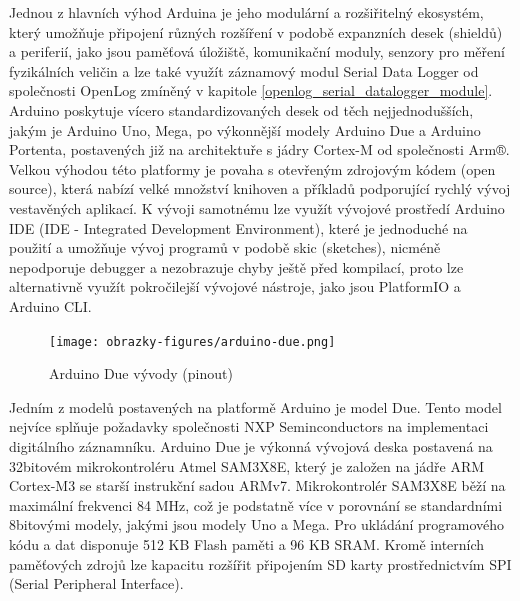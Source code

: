Jednou z hlavních výhod Arduina je jeho modulární a rozšiřitelný ekosystém, který umožňuje připojení různých rozšíření v podobě expanzních desek (shieldů) a periferií, jako jsou paměťová úložiště, komunikační moduly, senzory pro měření fyzikálních veličin a lze také využít záznamový modul Serial Data Logger od společnosti OpenLog zmíněný v kapitole \ref{openlog_serial_datalogger_module}. Arduino poskytuje vícero standardizovaných desek od těch nejjednodušších, jakým je Arduino Uno, Mega, po výkonnější modely Arduino Due a Arduino Portenta, postavených již na architektuře s jádry Cortex-M od společnosti Arm®. Velkou výhodou této platformy je povaha s otevřeným zdrojovým kódem (open source), která nabízí velké množství knihoven a příkladů podporující rychlý vývoj vestavěných aplikací. K vývoji samotnému lze využít vývojové prostředí Arduino IDE (IDE - Integrated Development Environment), které je jednoduché na použití a umožňuje vývoj programů v podobě skic (sketches), nicméně nepodporuje debugger a nezobrazuje chyby ještě před kompilací, proto lze alternativně využít pokročilejší vývojové nástroje, jako jsou PlatformIO a Arduino CLI.

\begin{figure}[h]
    \centering
    \texttt{[image: obrazky-figures/arduino-due.png]}
    
    \caption{Arduino Due vývody (pinout) \cite{arduino_shop_due}}
    \label{fig:arduino-due-pinout}
\end{figure}


Jedním z modelů postavených na platformě Arduino je model Due. Tento model nejvíce splňuje požadavky společnosti NXP Seminconductors na implementaci digitálního záznamníku. Arduino Due je výkonná vývojová deska postavená na 32bitovém mikrokontroléru Atmel SAM3X8E, který je založen na jádře ARM Cortex-M3 se starší instrukční sadou ARMv7. Mikrokontrolér SAM3X8E běží na maximální frekvenci 84 MHz, což je podstatně více v porovnání se  standardními 8bitovými modely, jakými jsou modely Uno a Mega. Pro ukládání programového kódu a dat disponuje 512 KB Flash paměti a 96 KB SRAM. Kromě interních paměťových zdrojů lze kapacitu rozšířit připojením SD karty prostřednictvím SPI (Serial Peripheral Interface). \cite{arduino_shop_due, arduino_shop_due}

